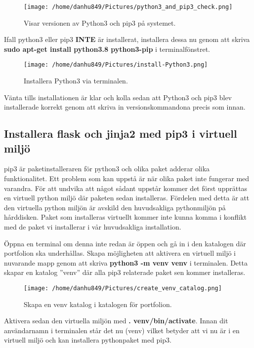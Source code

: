 \documentclass{TDP003mall}
\begin{document}
\begin{figure}[h]
  \centerline{\texttt{[image: /home/danhu849/Pictures/python3\_and\_pip3\_check.png]}}
  \caption{Visar versionen av Python3 och pip3 på systemet.}
  \label{fig}
\end{figure}

Ifall python3 eller pip3 \textbf{INTE} är installerat, installera dessa nu genom att skriva \textbf{sudo apt-get install python3.8 python3-pip} i terminalfönstret.

\begin{figure}[h]
  \centerline{\texttt{[image: /home/danhu849/Pictures/install-Python3.png]}}
  \caption{Installera Python3 via terminalen.}
  \label{fig}
\end{figure}

Vänta tills installationen är klar och kolla sedan att Python3 och pip3 blev installerade korrekt genom att skriva in versionskommandona precis som innan.

\subsection{Installera flask och jinja2 med pip3 i virtuell miljö}
pip3 är paketinstalleraren för python3 och olika paket adderar olika funktionalitet. Ett problem som kan uppstå är när olika paket inte fungerar med varandra. För att undvika att något sådant uppstår kommer det först upprättas en virtuell python miljö där paketen sedan installeras. Fördelen med detta är att den virtuella python miljön är avskild den huvudsakliga pythonmiljön på hårddisken. Paket som installeras virtuellt kommer inte kunna komma i konflikt med de paket vi installerar i vår huvudsakliga installation.

Öppna en terminal om denna inte redan är öppen och gå in i den katalogen där portfolion ska underhållas. Skapa möjligheten att aktivera en virtuell miljö i nuvarande mapp genom att skriva \textbf{python3 -m venv venv} i terminalen. Detta skapar en katalog ''venv'' där alla pip3 relaterade paket sen kommer installeras. 

\begin{figure}[h]
  \centerline{\texttt{[image: /home/danhu849/Pictures/create\_venv\_catalog.png]}}
  \caption{Skapa en venv katalog i katalogen för portfolion.}
  \label{fig}
\end{figure}

Aktivera sedan den virtuella miljön med \textbf{. venv/bin/activate}. Innan dit användarnamn i terminalen står det nu (venv) vilket betyder att vi nu är i en virtuell miljö och kan installera pythonpaket med pip3.
\end{document}
